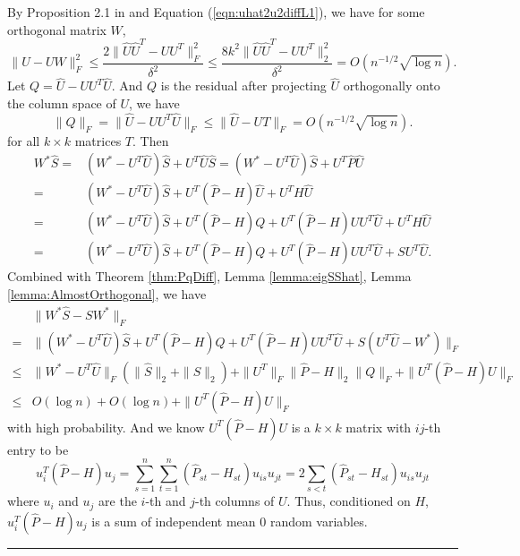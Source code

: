 \documentclass[a4paper]{article}
\newenvironment{proof}{{\bf Proof:  }}{\hfill\rule{2mm}{2mm}}
\begin{document}
\begin{proof}

By Proposition 2.1 in \cite{rohe2011spectral} and Equation (\ref{eqn:uhat2u2diffL1}), we have for some orthogonal matrix $W$,
\[
\|\hat{U} - U W\|_F^2 \le \frac{2 \|\hat{U} \hat{U}^T - U U^T\|_F^2}{\delta^2}
\le \frac{8 k^2 \|\hat{U} \hat{U}^T - U U^T\|_2^2}{\delta^2} = O(n^{-1/2} \sqrt{\log n}).
\]
Let $Q = \hat{U} - U U^T \hat{U}$. And $Q$ is the residual after projecting $\hat{U}$ orthogonally onto the column space of $U$, we have
\begin{equation}
\label{eqn:QFnorm}
\| Q \|_F = \| \hat{U} - U U^T \hat{U} \|_F \le \| \hat{U} - U T \|_F = O(n^{-1/2} \sqrt{\log n}).
\end{equation}
for all $k \times k$ matrices $T$. 
Then
\begin{align*}
	W^* \hat{S} = & (W^* - U^T \hat{U}) \hat{S} + U^T \hat{U} \hat{S}
    = (W^* - U^T \hat{U}) \hat{S} + U^T \hat{P} \hat{U} \\
    = & (W^* - U^T \hat{U}) \hat{S} + U^T (\hat{P} - H) \hat{U} + U^T H \hat{U} \\
    = & (W^* - U^T \hat{U}) \hat{S} + U^T (\hat{P} - H) Q + U^T (\hat{P} - H) U U^T \hat{U} + U^T H \hat{U} \\
    = & (W^* - U^T \hat{U}) \hat{S} + U^T (\hat{P} - H) Q + U^T (\hat{P} - H) U U^T \hat{U} + S U^T \hat{U}.
\end{align*}
Combined with Theorem \ref{thm:PqDiff}, Lemma \ref{lemma:eigSShat}, Lemma \ref{lemma:AlmostOrthogonal}, we have
\begin{align*}
	& \| W^* \hat{S} - S W^* \|_F \\
    = & \| (W^* - U^T \hat{U}) \hat{S} + U^T (\hat{P} - H) Q + U^T (\hat{P} - H) U U^T \hat{U} + S (U^T \hat{U} - W^*)\|_F \\
    \le & \| W^* - U^T \hat{U} \|_F (\| \hat{S} \|_2 + \| S \|_2) + \| U^T \|_F \| \hat{P} - H\|_2 \| Q \|_F + \| U^T (\hat{P} - H) U \|_F \\
    \le & O(\log n) + O(\log n) + \| U^T (\hat{P} - H) U \|_F
\end{align*}
with high probability. And we know $U^T (\hat{P} - H) U$ is a $k \times k$ matrix with $ij$-th entry to be
\[
	u_i^T (\hat{P} - H) u_j
    = \sum_{s=1}^n \sum_{t=1}^n (\hat{P}_{st} - H_{st}) u_{is} u_{jt}
    = 2 \sum_{s<t} (\hat{P}_{st} - H_{st}) u_{is} u_{jt}
\]
where $u_i$ and $u_j$ are the $i$-th and $j$-th columns of $U$. Thus, conditioned on $H$, $u_i^T (\hat{P} - H) u_j$ is a sum of independent mean 0 random variables.



\end{proof}
\end{document}
